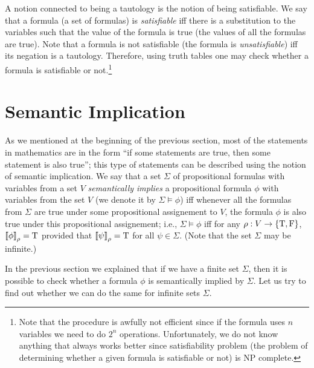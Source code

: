 A notion connected to being a tautology is the notion of being satisfiable.
We say that a formula (a set of formulas) is \emph{satisfiable} iff there
is a substitution to the variables such that the value of the formula is true
(the values of all the formulas are true). Note that a formula is not
satisfiable (the formula is \emph{unsatisfiable}) iff its negation is
a tautology. Therefore, using truth tables one may check whether a formula
is satisfiable or not.\footnote{%
  Note that the procedure is awfully not efficient since if the formula
  uses $n$ variables we need to do $2^n$ operations. Unfortunately,
  we do not know anything that always works better since
  satisfiability problem (the problem of determining whether a given formula is
  satisfiable or not) is NP complete.
}

\section{Semantic Implication}
As we mentioned at the beginning of the previous section, most of the
statements in mathematics are in the form
``if some statements are true, then some statement is also true'';
this type of statements can be described using the notion of semantic
implication. We say that a set $\Sigma$ of propositional formulas with
variables from a set $V$ \emph{semantically implies} a propositional formula
$\phi$ with variables from the set $V$ (we denote it by $\Sigma \models \phi$)
iff whenever all the formulas from $\Sigma$ are true under some propositional
assignement to $V$, the formula $\phi$ is also true under this propositional
assignement; i.e.,
$\Sigma \models \phi$ iff for any $\rho : V \to \set{\ltrue, \lfalse}$,
$\left\llbracket {\phi} \right\rrbracket_{\rho} = \text{T}$ provided that
$\left\llbracket {\psi} \right\rrbracket_{\rho} = \text{T}$ for all $\psi \in \Sigma$.
(Note that the set $\Sigma$ may be infinite.)

In the previous section we explained that if we have a finite set $\Sigma$,
then it is possible to check whether a formula $\phi$ is semantically implied
by $\Sigma$. Let us try to find out whether we can do the same for infinite
sets $\Sigma$.

